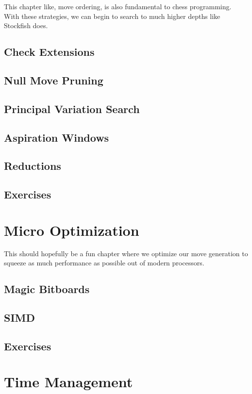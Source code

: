 \documentclass[letterpaper,11pt]{article}
\begin{document}
This chapter like, move ordering, is also fundamental to chess programming. With these strategies, 
we can begin to search to much higher depths like Stockfish does.

\subsection{Check Extensions}
\subsection{Null Move Pruning}
\subsection{Principal Variation Search}
\subsection{Aspiration Windows}
\subsection{Reductions}
\subsection{Exercises}

\section{Micro Optimization}

This should hopefully be a fun chapter where we optimize our move generation to squeeze as much performance 
as possible out of modern processors.

\subsection{Magic Bitboards}
\subsection{SIMD}
\subsection{Exercises}

\section{Time Management}
\end{document}
